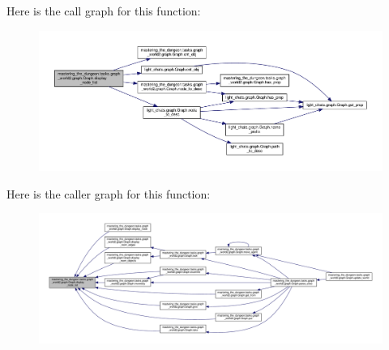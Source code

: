 Here is the call graph for this function\+:
\nopagebreak
\begin{figure}[H]
\begin{center}
\leavevmode
\includegraphics[width=350pt]{classmastering__the__dungeon_1_1tasks_1_1graph__world2_1_1graph_1_1Graph_aec236f9614180209537d7ce1c1145649_cgraph}
\end{center}
\end{figure}
Here is the caller graph for this function\+:
\nopagebreak
\begin{figure}[H]
\begin{center}
\leavevmode
\includegraphics[width=350pt]{classmastering__the__dungeon_1_1tasks_1_1graph__world2_1_1graph_1_1Graph_aec236f9614180209537d7ce1c1145649_icgraph}
\end{center}
\end{figure}
\mbox{\label{classmastering__the__dungeon_1_1tasks_1_1graph__world2_1_1graph_1_1Graph_aada7beb45751c1432f1b5056bfd927e7}} 
